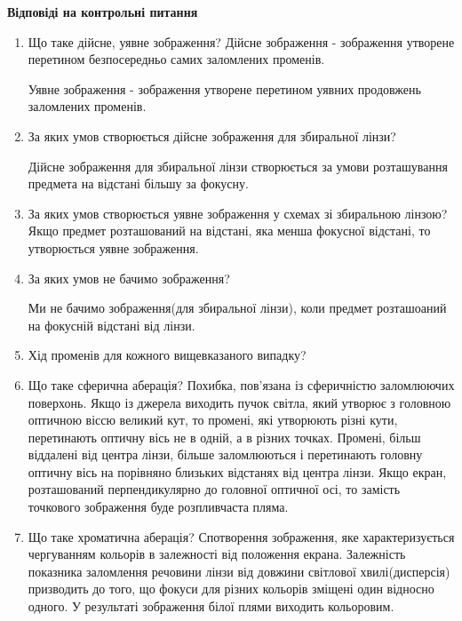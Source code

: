 \begin{center}
    \Large{\textbf{Відповіді на контрольні питання}}    
\end{center}

\vspace{1mm}

\begin{enumerate}
    \item Що таке дійсне, уявне зображення?  
    \bigbreak
    Дійсне зображення - зображення утворене перетином безпосередньо самих
    заломлених променів.

    Уявне зображення - зображення утворене перетином уявних продовжень
    заломлених променів.

    \item За яких умов створюється дійсне зображення для збиральної лінзи?
    \bigbreak
    
    Дійсне зображення для збиральної лінзи створюється за умови
    розташування предмета на відстані більшу за фокусну.

    \item За яких умов створюється уявне зображення у схемах зі збиральною лінзою?
    \bigbreak
    Якщо предмет розташований на відстані, яка менша фокусної відстані, то
    утворюється уявне зображення.

    \item За яких умов не бачимо зображення?
    \bigbreak

    Ми не бачимо зображення(для збиральної лінзи), коли
    предмет розташоаний на фокусній відстані від лінзи.

    \item Хід променів для кожного вищевказаного випадку?
    \bigbreak

    \item Що таке сферична аберація?
    \bigbreak
    Похибка, пов'язана із сферичністю заломлюючих поверхонь.
    Якщо із джерела виходить пучок світла, який утворює з
    головною оптичною віссю великий кут, то промені, які утворюють різні 
    кути, перетинають оптичну вісь не в одній, а в різних точках.
    Промені, більш віддалені від центра лінзи, більше заломлюються 
    і перетинають головну оптичну вісь на порівняно близьких відстанях від центра 
    лінзи. Якщо екран, розташований перпендикулярно до головної оптичної осі,
    то замість точкового зображення буде розпливчаста пляма.

    \item Що таке хроматична аберація?
    \bigbreak
    Спотворення зображення, яке характеризується 
    чергуванням кольорів в залежності від положення екрана.
    Залежність показника залом­лення речовини лінзи від довжини 
    світлової хвилі(дис­персія) призводить до того, що фокуси для 
    різних кольорів зміщені один відносно одного. У результаті 
    зображення білої плями виходить кольоровим.


\end{enumerate}
